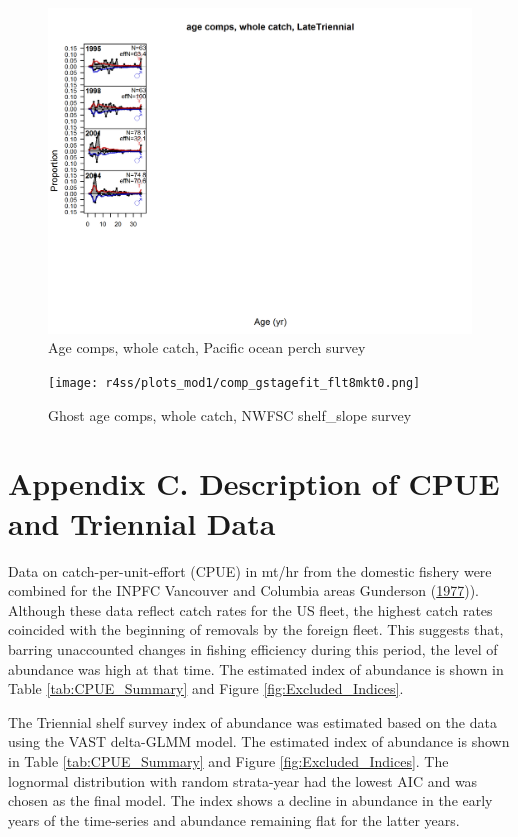 \documentclass[12pt,]{article}
\begin{document}
\begin{figure}
\centering
\includegraphics{r4ss/plots_mod1/comp_agefit_flt4mkt0.png}
\caption{Age comps, whole catch, Pacific ocean perch survey
\label{fig:age_fits}}
\end{figure}

\begin{figure}
\centering
\texttt{[image: r4ss/plots\_mod1/comp\_gstagefit\_flt8mkt0.png]}
\caption{Ghost age comps, whole catch, NWFSC shelf\_slope survey
\label{fig:age_fits}}
\end{figure}

\FloatBarrier

\section{Appendix C. Description of CPUE and Triennial
Data}\label{appendix-c.-description-of-cpue-and-triennial-data}

Data on catch-per-unit-effort (CPUE) in mt/hr from the domestic fishery
were combined for the INPFC Vancouver and Columbia areas Gunderson
(\protect\hyperlink{ref-gunderson_population_1977}{1977})). Although
these data reflect catch rates for the US fleet, the highest catch rates
coincided with the beginning of removals by the foreign fleet. This
suggests that, barring unaccounted changes in fishing efficiency during
this period, the level of abundance was high at that time. The estimated
index of abundance is shown in Table \ref{tab:CPUE_Summary} and Figure
\ref{fig:Excluded_Indices}.

The Triennial shelf survey index of abundance was estimated based on the
data using the VAST delta-GLMM model. The estimated index of abundance
is shown in Table \ref{tab:CPUE_Summary} and Figure
\ref{fig:Excluded_Indices}. The lognormal distribution with random
strata-year had the lowest AIC and was chosen as the final model. The
index shows a decline in abundance in the early years of the time-series
and abundance remaining flat for the latter years.
\end{document}
